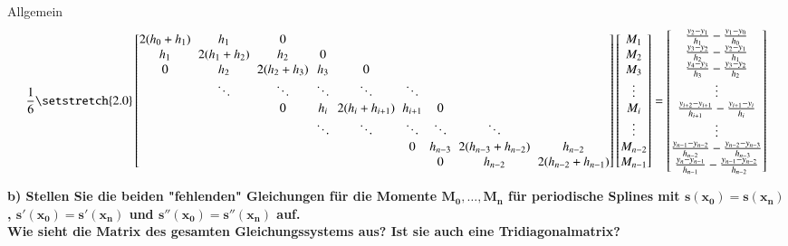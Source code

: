 \documentclass[10pt,a4paper]{article}
\begin{document}
		Allgemein
		\begin{align*}
		\frac{1}{6} 
		\begingroup %
		\setlength\arraycolsep{3pt}
		\setstretch{2.0}
		\begin{bmatrix}
			2(h_0+h_1) & h_1        & 0          &        &                &         &         &                    &  \\
			h_1        & 2(h_1+h_2) & h_2        & 0      &                &         &         &                    &  \\
			0          & h_2        & 2(h_2+h_3) & h_3    & 0              &         &         &                    &  \\
			           & \ddots     & \ddots     & \ddots & \ddots         & \ddots  &         &                    &  \\
			           &            & 0          & h_i    & 2(h_i+h_{i+1}) & h_{i+1} & 0       &                    &  \\
			           &            &            & \ddots & \ddots         & \ddots  & \ddots  & \ddots             &  \\
			           &            &            &        &                & 0       & h_{n-3} & 2(h_{n-3}+h_{n-2}) & h_{n-2}            \\
			           &            &            &        &                &         & 0       & h_{n-2}            & 2(h_{n-2}+h_{n-1})
		\end{bmatrix}
		\endgroup
		\begin{bmatrix}
			M_1     \\
			M_2     \\
			M_3     \\
			\vdots  \\
			M_i     \\
			\vdots  \\
			M_{n-2} \\
			M_{n-1}
		\end{bmatrix}
		=
		\begin{bmatrix}
			\frac{y_{2}-y_{1}}{h_{1}}-\frac{y_{1}-y_{0}}{h_0}           \\
			\frac{y_{3}-y_{2}}{h_{2}}-\frac{y_{2}-y_{1}}{h_1}           \\
			\frac{y_{4}-y_{3}}{h_{3}}-\frac{y_{3}-y_{2}}{h_2}           \\
			\vdots \\
			\frac{y_{i+2}-y_{i+1}}{h_{i+1}}-\frac{y_{i+1}-y_i}{h_i}     \\
			\vdots \\
			\frac{y_{n-1}-y_{n-2}}{h_{n-2}}-\frac{y_{n-2}-y_{n-3}}{h_{n-3}}   \\
			\frac{y_{n}-y_{n-1}}{h_{n-1}}-\frac{y_{n-1}-y_{n-2}}{h_{n-2}}
		\end{bmatrix}
		\end{align*}			
			
	\textbf{%
		b) Stellen Sie die beiden "fehlenden" Gleichungen für die Momente $\mathbf{M_0, \dots, M_n}$ für periodische Splines mit $\mathbf{s(x_0) = s(x_n)}$, $\mathbf{s′(x_0) = s′(x_n)}$ und $\mathbf{s''(x_0)=s''(x_n)}$ auf. \\
		Wie sieht die Matrix des gesamten Gleichungssystems aus? Ist sie auch eine Tridiagonalmatrix?
	}
\end{document}

